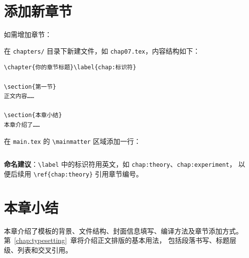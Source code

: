 \section{添加新章节}

如需增加章节：

\begin{compactenum}
    \item 在 \texttt{chapters/} 目录下新建文件，如 \texttt{chap07.tex}，内容结构如下：
\begin{verbatim}
\chapter{你的章节标题}\label{chap:标识符}

\section{第一节}
正文内容……

\section{本章小结}
本章介绍了……
\end{verbatim}
    \item 在 \texttt{main.tex} 的 \verb|\mainmatter| 区域添加一行：
\begin{verbatim}

\end{verbatim}
\end{compactenum}

\textbf{命名建议}：\verb|\label| 中的标识符用英文，如 \verb|chap:theory|、\verb|chap:experiment|，
以便后续用 \verb|\ref{chap:theory}| 引用章节编号。

\section{本章小结}

本章介绍了模板的背景、文件结构、封面信息填写、编译方法及章节添加方式。
第~\ref{chap:typesetting}~章将介绍正文排版的基本用法，
包括段落书写、标题层级、列表和交叉引用。
